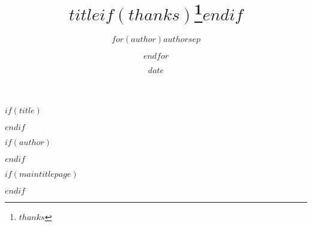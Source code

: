 
$if(title)$
\title{$title$$if(thanks)$\thanks{$thanks$}$endif$}
$endif$

$if(author)$
\author{$for(author)$$author$$sep$ \and $endfor$}
$endif$

\date{$date$}



$if(maintitlepage)$
\usepackage[absolute,overlay]{textpos}
  \setlength{\TPHorizModule}{1mm}
  \setlength{\TPVertModule}{1mm}

\newcommand{\MainTitlePage}[2]{
  \pagestyle{empty}
    \begin{center}
		\texttt{[image: images/logo.png]}
		\LARGE
		\mbox{Universidad Nacional de Educación a Distancia}
		\LARGE
		\mbox{Escuela Técnica Superior de Informática}

		\LARGE
		\mbox{Máster en Ingeniería y Ciencia de Datos}

		\vspace{2cm}
		
		\LARGE
		\textbf{Trabajo Fin de Máster}
		
		\LARGE
		\textbf{\thetitle}

		
		\vspace{2cm}		
		
	\end{center}  
	
	\begin{flushright}
		\LARGE
		\begin{tabular}{ r l }
			Autor: & \theauthor \\
			Directores: & Emilio Letón Molina \\
			& Jorge Pérez Martín \\
			Fecha de realización: & \thedate
		\end{tabular}
		
	\end{flushright}

  \evenpage
  \SmallMargins
  \thispagestyle{empty}
  
}
$endif$

\newcommand{\evenpage}{
  \clearpage
  \strictpagecheck %
  \checkoddpage
  \ifoddpage
    \thispagestyle{empty}
    ~\\ %
    \newpage
  \else
  \fi

  
}
